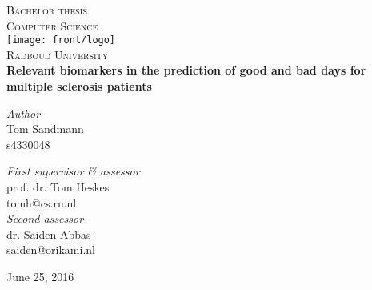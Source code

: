 \begin{titlepage}
	\begin{center}
		\textsc{\LARGE Bachelor thesis\\Computer Science}\\[1.5cm]
		\texttt{[image: front/logo]}\\
		\vspace{0.4cm}
		\textsc{\Large Radboud University}\\[1cm]
		\vspace{0.4cm}
		\textbf{\huge Relevant biomarkers in the prediction of good and bad days for multiple sclerosis patients}\\[0.4cm]
		\vspace{2cm}
		\begin{minipage}[t]{0.45\textwidth}
			\begin{flushleft} \large
				\textit{Author}\\
				Tom Sandmann\\
				s4330048
			\end{flushleft}
		\end{minipage}
		\begin{minipage}[t]{0.45\textwidth}
			\begin{flushright} \large
				\textit{First supervisor \& assessor}\\
				prof. dr. Tom Heskes\\
				tomh@cs.ru.nl\\[1.3cm]
				\textit{Second assessor}\\
				dr. Saiden Abbas\\
				saiden@orikami.nl
			\end{flushright}
		\end{minipage}
		\vfill
		{\large June 25, 2016}
	\end{center}
\end{titlepage}
